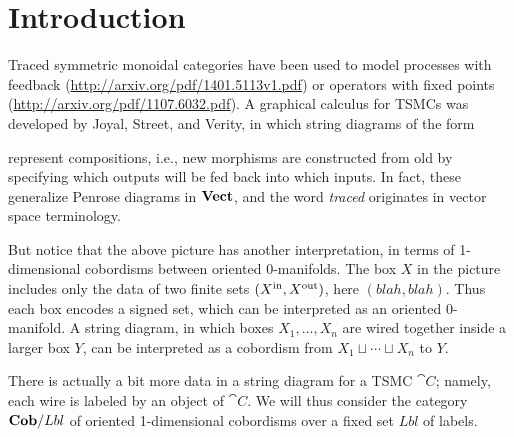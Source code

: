 \chapter{Introduction}

Traced symmetric monoidal categories have been used to model processes with feedback (\url{http://arxiv.org/pdf/1401.5113v1.pdf})  or operators with fixed points (\url{http://arxiv.org/pdf/1107.6032.pdf}). A graphical calculus for TSMCs was developed by Joyal, Street, and Verity, in which string diagrams of the form
\begin{center}
\end{center}
represent compositions, i.e., new morphisms are constructed from old by specifying which outputs will be fed back into which inputs. In fact, these generalize Penrose diagrams in $\mathbf{Vect}$, and the word \emph{traced} originates in vector space terminology.  

But notice that the above picture has another interpretation, in terms of 1-dimensional cobordisms between oriented 0-manifolds. The box $X$ in the picture includes only the data of two finite sets $(X^{\text{in}},X^{\text{out}})$, here $(blah,blah)$. Thus each box encodes a signed set, which can be interpreted as an oriented 0-manifold. A string diagram, in which boxes $X_1,\ldots,X_n$ are wired together inside a larger box $Y$, can be interpreted as a cobordism from $X_1\sqcup\cdots\sqcup X_n$ to $Y$. 

There is actually a bit more data in a string diagram for a TSMC $\cat{C}$; namely, each wire is labeled by an object of $\cat{C}$. We will thus consider the category $\mathbf{Cob}/Lbl$ of oriented 1-dimensional cobordisms over a fixed set $Lbl$ of labels. 

